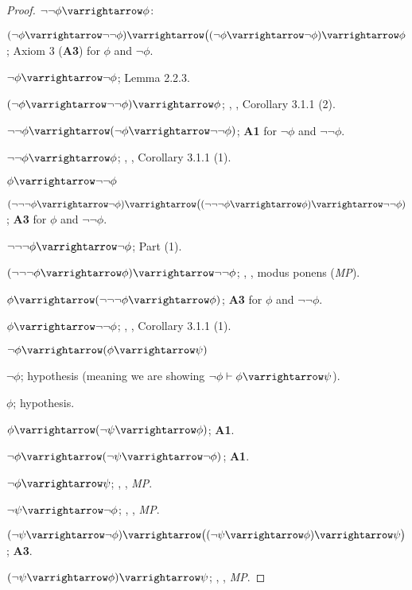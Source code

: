 \documentclass[10pt]{article}
\let\to=\varrightarrow
\begin{document}
\begin{proof}

    \benum
        \item $\neg\neg\phi\to\phi$:
        \benum
            \item $(\neg\phi\to\neg\neg\phi)\to\bigl((\neg\phi\to\neg\phi)\to\phi$; Axiom $3$ (\textbf{A3}) for $\phi$ and $\neg\phi$.
            \item $\neg\phi\to\neg\phi$; Lemma 2.2.3.
            \item $(\neg\phi\to\neg\neg\phi)\to\phi$; , , Corollary 3.1.1 (2).
            \item $\neg\neg\phi\to(\neg\phi\to\neg\neg\phi)$; \textbf{A1} for $\neg\phi$ and $\neg\neg\phi$.
            \item $\neg\neg\phi\to\phi$; , , Corollary 3.1.1 (1).
        \eenum
        \item $\phi\to\neg\neg\phi$
        \benum
            \item $(\neg\neg\neg\phi\to\neg\phi)\to\bigl((\neg\neg\neg\phi\to\phi)\to\neg\neg\phi)$; \textbf{A3} for $\phi$ and $\neg\neg\phi$.
            \item $\neg\neg\neg\phi\to\neg\phi$; Part (1).
            \item $(\neg\neg\neg\phi\to\phi)\to\neg\neg\phi$; , , modus ponens (\textit{MP}).
            \item $\phi\to(\neg\neg\neg\phi\to\phi)$; \textbf{A3} for $\phi$ and $\neg\neg\phi$.
            \item $\phi\to\neg\neg\phi$; , , Corollary 3.1.1 (1).
        \eenum
        \item $\neg\phi\to(\phi\to\psi)$
        \benum
            \item $\neg\phi$; hypothesis (meaning we are showing $\neg\phi\vdash\phi\to\psi$).
            \item $\phi$; hypothesis.
            \item $\phi\to(\neg\psi\to\phi)$; \textbf{A1}.
            \item $\neg\phi\to(\neg\psi\to\neg\phi)$; \textbf{A1}.
            \item $\neg\phi\to\psi$; , , \textit{MP}.
            \item $\neg\psi\to\neg\phi$; , , \textit{MP}.
            \item $(\neg\psi\to\neg\phi)\to\bigl((\neg\psi\to\phi)\to\psi\bigr)$; \textbf{A3}.
            \item $(\neg\psi\to\phi)\to\psi$; , , \textit{MP}.

\end{proof}
\end{document}
